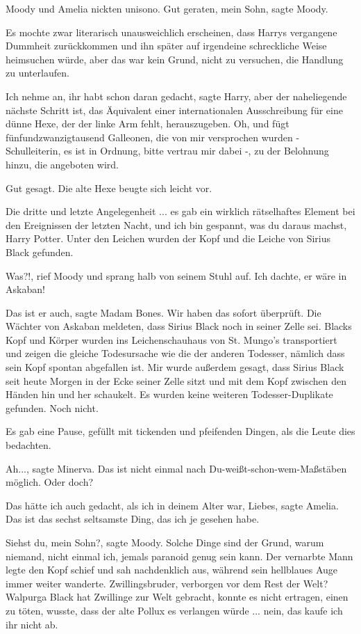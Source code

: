 Moody und Amelia nickten unisono. \glqq{}Gut geraten, mein Sohn\grqq{}, sagte
Moody.

Es mochte zwar literarisch unausweichlich erscheinen, dass Harrys vergangene
Dummheit zurückkommen und ihn später auf irgendeine schreckliche Weise
heimsuchen würde, aber das war kein Grund, nicht zu versuchen, die Handlung zu
unterlaufen.

\glqq{}Ich nehme an, ihr habt schon daran gedacht\grqq{}, sagte Harry, \glqq{}aber
der naheliegende nächste Schritt ist, das Äquivalent einer internationalen
Ausschreibung für eine dünne Hexe, der der linke Arm fehlt, herauszugeben. Oh,
und fügt fünfundzwanzigtausend Galleonen, die von mir versprochen wurden -
Schulleiterin, es ist in Ordnung, bitte vertrau mir dabei -, zu der Belohnung
hinzu, die angeboten wird.\grqq{}

\glqq{}Gut gesagt.\grqq{} Die alte Hexe beugte sich leicht vor.

\glqq{}Die dritte und letzte Angelegenheit ... es gab ein wirklich rätselhaftes
Element bei den Ereignissen der letzten Nacht, und ich bin gespannt, was du
daraus machst, Harry Potter. Unter den Leichen wurden der Kopf und die Leiche
von Sirius Black gefunden.\grqq{}

\glqq{}Was?!\grqq{}, rief Moody und sprang halb von seinem Stuhl auf. \glqq{}Ich
dachte, er wäre in Askaban!\grqq{}

\glqq{}Das ist er auch\grqq{}, sagte Madam Bones. \glqq{}Wir haben das sofort
überprüft. Die Wächter von Askaban meldeten, dass Sirius Black noch in seiner
Zelle sei. Blacks Kopf und Körper wurden ins Leichenschauhaus von St. Mungo's
transportiert und zeigen die gleiche Todesursache wie die der anderen Todesser,
nämlich dass sein Kopf spontan abgefallen ist. Mir wurde außerdem gesagt, dass
Sirius Black seit heute Morgen in der Ecke seiner Zelle sitzt und mit dem Kopf
zwischen den Händen hin und her schaukelt. Es wurden keine weiteren
Todesser-Duplikate gefunden. Noch nicht.\grqq{}

Es gab eine Pause, gefüllt mit tickenden und pfeifenden Dingen, als die Leute
dies bedachten.

\glqq{}Ah...\grqq{}, sagte Minerva. \glqq{}Das ist nicht einmal nach
Du-weißt-schon-wem-Maßstäben möglich. Oder doch?\grqq{}

\glqq{}Das hätte ich auch gedacht, als ich in deinem Alter war, Liebes\grqq{},
sagte Amelia. \glqq{}Das ist das sechst seltsamste Ding, das ich je gesehen
habe.\grqq{}

\glqq{}Siehst du, mein Sohn?\grqq{}, sagte Moody. \glqq{}Solche Dinge sind der
Grund, warum niemand, nicht einmal ich, jemals paranoid genug sein kann.\grqq{} Der
vernarbte Mann legte den Kopf schief und sah nachdenklich aus, während sein
hellblaues Auge immer weiter wanderte. \glqq{}Zwillingsbruder, verborgen vor dem
Rest der Welt? Walpurga Black hat Zwillinge zur Welt gebracht, konnte es nicht
ertragen, einen zu töten, wusste, dass der alte Pollux es verlangen würde ...
nein, das kaufe ich ihr nicht ab.\grqq{}

